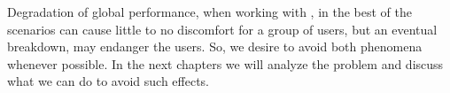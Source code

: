 \documentclass[../main.tex]{subfiles}
\begin{document}
Degradation of global performance, when working with \cps{}, in the best of the scenarios can cause little to no discomfort for a group of users, but an eventual breakdown, may endanger the users.
So, we desire to avoid both phenomena whenever possible.
In the next chapters we will analyze the problem and discuss what we can do to avoid such effects.
\end{document}
